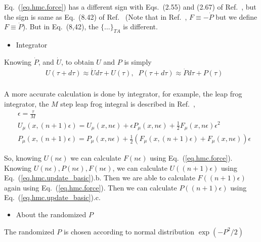 Eq.~(\ref{eq.hmc.force}) has a different sign with Eqs.~(2.55) and (2.67) of Ref.~\cite{latticeqcdbook2017}, but the sign is same as Eq.~(8.42) of Ref.~\cite{latticeqcdbook2010} (Note that in Ref.~\cite{latticeqcdbook2010}, $F\equiv -\dot{P}$ but we define $F\equiv \dot{P}$). But in Eq.~(8,42), the $\{\ldots\}_{TA}$ is different.

\begin{itemize}
\item {}Integrator
\end{itemize}

Knowing $\dot{P}$, and $\dot {U}$, to obtain $U$ and $P$ is simply
\begin{equation}
\begin{split}
&U(\tau+d\tau)\approx \dot{U}d\tau + U(\tau),\;\;P(\tau+d\tau)\approx \dot{P}d\tau + P(\tau)\\
\end{split}
\end{equation}

A more accurate calculation is done by integrator, for example, the leap frog integrator, the $M$ step leap frog integral is described in Ref.~\cite{latticeqcdbook2010},
\begin{subequations}
\begin{eqnarray}
&\epsilon = \frac{\tau}{M}\\
&U_{\mu}(x,(n+1)\epsilon)=U_{\mu}(x,n\epsilon)+\epsilon P_{\mu}(x,n\epsilon)+\frac{1}{2}F_{\mu}(x,n\epsilon)\epsilon ^2\\
&P_{\mu}(x,(n+1)\epsilon)=P_{\mu}(x,n\epsilon)+\frac{1}{2}\left(F_{\mu}(x,(n+1)\epsilon)+F_{\mu}(x,n\epsilon)\right)\epsilon
\end{eqnarray}
\label{eq.hmc.update_basic}
\end{subequations}

So, knowing $U(n\epsilon)$ we can calculate $F(n\epsilon)$ using Eq.~(\ref{eq.hmc.force}).
Knowing $U(n\epsilon),P(n\epsilon),F(n\epsilon)$, we can calculate $U((n+1)\epsilon)$ using Eq.~(\ref{eq.hmc.update_basic}).b.
Then we are able to calculate $F((n+1)\epsilon)$ again using Eq.~(\ref{eq.hmc.force}).
Then we can calculate $P((n+1)\epsilon)$ using Eq.~(\ref{eq.hmc.update_basic}).c.

\begin{itemize}
  \item About the randomized $P$
\end{itemize}

The randomized $P$ is chosen according to normal distribution $\exp \left(-P^2 /2\right)$

